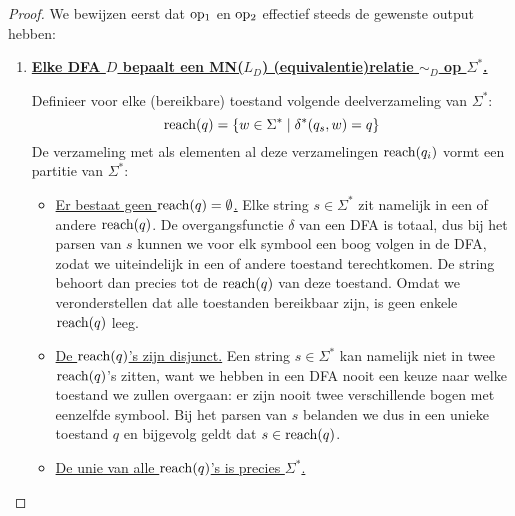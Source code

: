 \documentclass[../aanvullingen_cursus.tex]{subfiles}
\begin{document}
\begin{proof}
	We bewijzen eerst dat \(\operatorname{op_1}\) en \(\operatorname{op_2}\) effectief steeds de gewenste output hebben:
	\begin{enumerate}
		\item \underline{\textbf{Elke DFA \(D\) bepaalt een MN(\(L_D\)) (equivalentie)relatie \(\sim_D\)  op \(\Sigma^*\).}}

		Definieer voor elke (bereikbare) toestand volgende deelverzameling van \(\Sigma^*\): \[\operatorname{reach}(q) = \{w \in \Sigma^* \mid \delta^*(q_s,w)=q\}\] De verzameling met als elementen al deze verzamelingen \(\operatorname{reach}(q_i)\) vormt een partitie van \(\Sigma^*\):
		\begin{itemize}
			\item \underline{Er bestaat geen \(\operatorname{reach}(q)=\emptyset\).} Elke string \(s \in \Sigma^*\) zit namelijk in een of andere \(\operatorname{reach}(q)\). De overgangsfunctie \(\delta\) van een DFA is totaal, dus bij het parsen van \(s\) kunnen we voor elk symbool een boog volgen in de DFA, zodat we uiteindelijk in een of andere toestand terechtkomen. De string behoort dan precies tot de \(\operatorname{reach}(q)\) van deze toestand. Omdat we veronderstellen dat alle toestanden bereikbaar zijn, is geen enkele \(\operatorname{reach}(q)\) leeg.
			\item \underline{De \(\operatorname{reach}(q)\)'s zijn disjunct.} Een string \(s \in \Sigma^*\) kan namelijk niet in twee \(\operatorname{reach}(q)\)'s zitten, want we hebben in een DFA nooit een keuze naar welke toestand we zullen overgaan: er zijn nooit twee verschillende bogen met eenzelfde symbool. Bij het parsen van \(s\) belanden we dus in een unieke toestand \(q\) en bijgevolg geldt dat \(s \in \operatorname{reach}(q)\).
			\item \underline{De unie van alle \(\operatorname{reach}(q)\)'s is precies \(\Sigma^*\).}
		\end{itemize}


\end{enumerate}
\end{proof}
\end{document}
